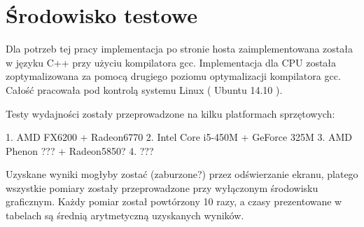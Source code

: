

%


\section { Środowisko testowe }

Dla potrzeb tej pracy implementacja po stronie hosta zaimplementowana została w języku C++ przy użyciu kompilatora gcc. Implementacja dla CPU została zoptymalizowana za pomocą drugiego poziomu optymalizacji kompilatora gcc. Całość pracowała pod kontrolą systemu Linux ( Ubuntu 14.10 ). 

Testy wydajności zostały przeprowadzone na kilku platformach sprzętowych:

1. AMD FX6200 + Radeon6770
2. Intel Core i5-450M + GeForce 325M
3. AMD Phenon ??? + Radeon5850?
4. ???

Uzyskane wyniki mogłyby zostać (zaburzone?) przez odświerzanie ekranu, platego wszystkie pomiary zostały przeprowadzone przy wyłączonym środowisku graficznym. Każdy pomiar został powtórzony 10 razy, a czasy prezentowane w tabelach są średnią arytmetyczną uzyskanych wyników. 
